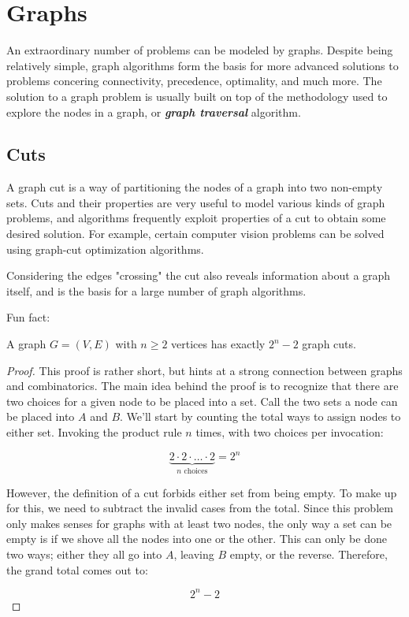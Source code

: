 \documentclass{standalone}
\begin{document}
\section{Graphs} \label{sec:graphs}

An extraordinary number of problems can be modeled by graphs. Despite being
relatively simple, graph algorithms form the basis for more advanced solutions
to problems concering connectivity, precedence, optimality, and much more. The
solution to a graph problem is usually built on top of the methodology used to
explore the nodes in a graph, or \textbf{\emph{graph traversal}} algorithm.

\subsection{Cuts} \label{sec:graphs:cuts}

A graph cut is a way of partitioning the nodes of a graph into two non-empty
sets. Cuts and their properties are very useful to model various kinds of graph
problems, and algorithms frequently exploit properties of a cut to obtain some
desired solution. For example, certain computer vision problems can be solved
using graph-cut optimization algorithms.

Considering the edges "crossing" the cut also reveals information about a graph
itself, and is the basis for a large number of graph algorithms.


Fun fact:

\begin{theorem}
  A graph $G = (V,E)$ with $n \geqslant 2$ vertices has exactly $2^n - 2$ graph
  cuts.
\end{theorem}

\begin{proof}
  This proof is rather short, but hints at a strong connection between graphs
  and combinatorics. The main idea behind the proof is to recognize that there
  are two choices for a given node to be placed into a set. Call the two sets
  a node can be placed into $A$ and $B$. We'll start by counting the total ways
  to assign nodes to either set. Invoking the product rule $n$ times, with two
  choices per invocation:

  \[
    \underbrace{2 \cdot 2 \cdot \dots \cdot 2}_\text{$n$ choices} = 2^n
  \]

  However, the definition of a cut forbids either set from being empty. To make
  up for this, we need to subtract the invalid cases from the total. Since this
  problem only makes senses for graphs with at least two nodes, the only way a
  set can be empty is if we shove all the nodes into one or the other. This can
  only be done two ways; either they all go into $A$, leaving $B$ empty, or the
  reverse. Therefore, the grand total comes out to:

  \[
    2^n - 2
  \]
\end{proof}
\end{document}
